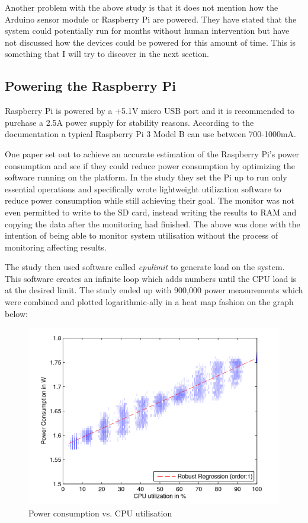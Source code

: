 \documentclass[10pt,a4paper]{article}
\begin{document}
Another problem with the above study is that it does not mention how the Arduino sensor module or Raspberry Pi are powered. They have stated that the system could potentially run for months without human intervention but have not discussed how the devices could be powered for this amount of time. This is something that I will try to discover in the next section.
\subsection{Powering the Raspberry Pi}
Raspberry Pi is powered by a +5.1V micro USB port and it is recommended to purchase a 2.5A power supply for stability reasons. According to the documentation a typical Raspberry Pi 3 Model B can use between 700-1000mA\cite{piDoc}. 

One paper set out to achieve an accurate estimation of the Raspberry Pi's power consumption and see if they could reduce power consumption by optimizing the software running on the platform\cite{Kaup2014}. In the study they set the Pi up to run only essential operations and specifically wrote lightweight utilization software to reduce power consumption while still achieving their goal. The monitor was not even permitted to write to the SD card, instead writing the results to RAM and copying the data after the monitoring had finished. The above was done with the intention of being able to monitor system utilisation without the process of monitoring affecting results. 

The study then used software called \textit{cpulimit} to generate load on the system. This software creates an infinite loop which adds numbers until the CPU load is at the desired limit. The study ended up with 900,000 power measurements which were combined and plotted logarithmic-ally in a heat map fashion on the graph below:

\begin{figure}[H]
\centering
  \includegraphics[width=\linewidth]{images/powerconsumption.png}
  \caption{Power consumption vs. CPU utilisation\cite{Kaup2014}}
  \label{fig:pwervscpu}
\end{figure}
\end{document}
